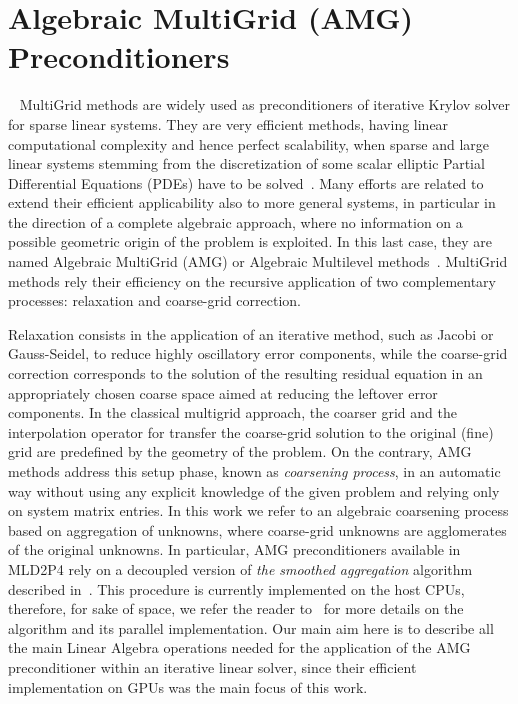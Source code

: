 \section{Algebraic MultiGrid (AMG) Preconditioners}~\label{AMG}
%
MultiGrid methods are widely used as preconditioners of iterative
Krylov solver for sparse linear systems. 
They are very efficient methods, having linear computational
complexity and hence perfect scalability, when 
sparse and large linear systems stemming
from the discretization of some scalar elliptic Partial Differential
Equations (PDEs) have to be solved~\cite{V2008}. 
Many efforts are related to extend their efficient applicability also
to more general systems, in particular in the direction of a complete
algebraic approach, where no information on a possible geometric
origin of the problem is exploited. In this last case, they are named
Algebraic MultiGrid (AMG) or Algebraic Multilevel
methods~\cite{Stuben2001}. 
MultiGrid methods rely their efficiency on the recursive application
of two complementary processes: {relaxation and coarse-grid
  correction}. 

Relaxation consists in the application of an iterative method, such as
Jacobi or Gauss-Seidel, to reduce highly oscillatory error components,
while the coarse-grid correction corresponds to the solution of the
resulting residual equation in an appropriately chosen coarse space
aimed at reducing the leftover error components. In the classical
multigrid approach, the coarser grid and the interpolation operator
for transfer the coarse-grid solution to the original (fine) grid are
predefined by the geometry of the problem. On the contrary, AMG
methods address this setup phase, known as \emph{coarsening process},
in an automatic way without using any explicit knowledge of the given
problem and relying only on system matrix entries. In this work we
refer to an algebraic coarsening process based on aggregation of
unknowns, where coarse-grid unknowns are agglomerates of the original
unknowns. In particular, AMG preconditioners available in MLD2P4 rely
on a decoupled version of \emph{the smoothed aggregation} algorithm
described in~\cite{BrezinaVanek96,BrezinaVanek99}. This procedure is
currently implemented on the host CPUs, therefore, for sake of space,
we refer the reader to~\cite{mld2p4-2-guide} for more details on the
algorithm and its parallel implementation. 
Our main aim here is to describe all the main Linear Algebra
operations needed for the application of the AMG preconditioner within
an iterative  linear solver, since their efficient implementation on
GPUs was the main focus of this work. 

